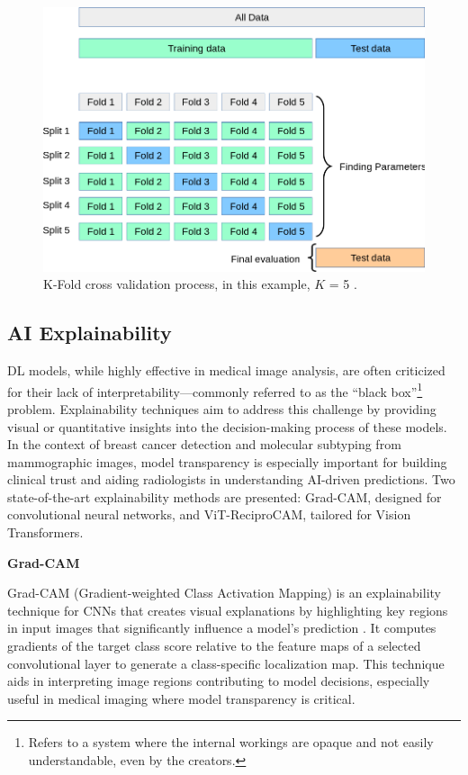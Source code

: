 \documentclass[a4paper,10pt]{book}
\begin{document}
\begin{figure}[h!]
    \centering
    \includegraphics[width=0.75\linewidth]{reports//assets/k-fold.png}
    \caption[K-Fold Cross Validation]{K-Fold cross validation process, in this example, $K$ = 5 \cite{noauthor_31_nodate}.}
    \label{fig:k_fold}
\end{figure}

\subsection{AI Explainability}

DL models, while highly effective in medical image analysis, are often criticized for their lack of interpretability—commonly referred to as the “black box”\footnote{Refers to a system where the internal workings are opaque and not easily understandable, even by the creators.} problem. Explainability techniques aim to address this challenge by providing visual or quantitative insights into the decision-making process of these models. In the context of breast cancer detection and molecular subtyping from mammographic images, model transparency is especially important for building clinical trust and aiding radiologists in understanding AI-driven predictions. Two state-of-the-art explainability methods are presented: Grad-CAM, designed for convolutional neural networks, and ViT-ReciproCAM, tailored for Vision Transformers.

\textbf{Grad-CAM}

Grad-CAM (Gradient-weighted Class Activation Mapping) is an explainability technique for CNNs that creates visual explanations by highlighting key regions in input images that significantly influence a model's prediction \cite{noauthor_161002391_nodate}. It computes gradients of the target class score relative to the feature maps of a selected convolutional layer to generate a class-specific localization map. This technique aids in interpreting image regions contributing to model decisions, especially useful in medical imaging where model transparency is critical.
\end{document}
